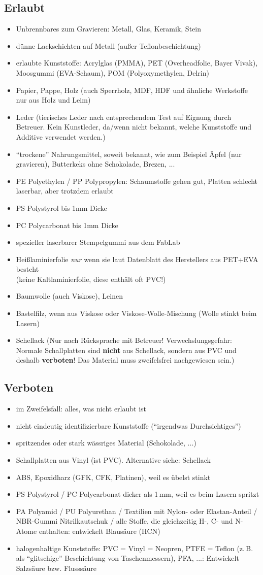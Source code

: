 \documentclass{\basedir/fablab-document}
\begin{document}
	\subsection{Erlaubt}
	\newcommand{\itemCheck}{\item[\checkmark]}
	\begin{itemize}
		\itemCheck Unbrennbares zum Gravieren: Metall, Glas, Keramik, Stein
		\itemCheck dünne Lackschichten auf Metall (außer Teflonbeschichtung)
		\itemCheck erlaubte Kunststoffe: Acrylglas (PMMA), PET (Overheadfolie, Bayer Vivak), Moosgummi (EVA-Schaum), POM (Polyoxymethylen, Delrin)
		\itemCheck Papier, Pappe, Holz (auch Sperrholz, MDF, HDF und ähnliche Werkstoffe nur aus Holz und Leim)
		\itemCheck Leder (tierisches Leder nach entsprechendem Test auf Eignung durch Betreuer. Kein Kunstleder, da/wenn nicht bekannt, welche Kunststoffe und Additive verwendet werden.)
		\itemCheck \enquote{trockene} Nahrungsmittel, soweit bekannt, wie zum Beispiel Äpfel (nur gravieren), Butterkeks ohne Schokolade, Brezen, ...
		\itemCheck PE Polyethylen / PP Polypropylen: Schaumstoffe gehen gut, Platten schlecht laserbar, aber trotzdem erlaubt
		\itemCheck PS Polystyrol bis 1mm Dicke
		\itemCheck PC Polycarbonat bis 1mm Dicke
		\itemCheck spezieller laserbarer Stempelgummi aus dem FabLab
		\itemCheck Heißlaminierfolie \emph{nur} wenn sie laut Datenblatt des Herstellers aus PET+EVA besteht\\(keine Kaltlaminierfolie, diese enthält oft PVC!)
		\itemCheck Baumwolle (auch Viskose), Leinen
		\itemCheck Bastelfilz, wenn aus Viskose oder Viskose-Wolle-Mischung (Wolle stinkt beim Lasern)
		\itemCheck Schellack (Nur nach Rücksprache mit Betreuer! Verwechslungsgefahr: Normale Schallplatten sind \textbf{nicht} aus Schellack, sondern aus PVC und deshalb \textbf{verboten}! Das Material muss zweifelsfrei nachgewiesen sein.)
	\end{itemize}

	\newpage %

	\subsection{Verboten}
	\newcommand{\itemCross}{\item[$\times$]}
	\begin{itemize}
		\itemCross im Zweifelsfall: alles, was nicht erlaubt ist
		\itemCross nicht eindeutig identifizierbare Kunststoffe (\enquote{irgendwas Durchsichtiges})
		\itemCross spritzendes oder stark wässriges Material (Schokolade, ...)
		\itemCross Schallplatten aus Vinyl (ist PVC). Alternative siehe: Schellack
		\itemCross ABS, Epoxidharz (GFK, CFK, Platinen), weil es übelst stinkt
		\itemCross PS Polystyrol / PC Polycarbonat dicker als 1\,mm, weil es beim Lasern spritzt
		\itemCross PA Polyamid / PU Polyurethan / Textilien mit Nylon- oder Elastan-Anteil / NBR-Gummi Nitrilkautschuk / alle Stoffe, die gleichzeitig H-, C- und N-Atome enthalten: entwickelt Blausäure (HCN)
		\itemCross halogenhaltige Kunststoffe: PVC = Vinyl = Neopren, PTFE = Teflon (z.\,B. als \enquote{glitschige} Beschichtung von Taschenmessern), PFA, ...: Entwickelt Salzsäure bzw. Flusssäure
	\end{itemize}
\end{document}
